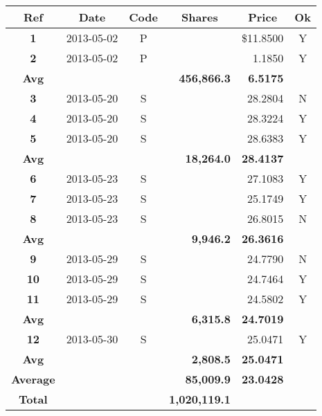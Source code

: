 \begin{longtable}{clcrrc}
\bfseries{Ref}&
\multicolumn{1}{c}{\bfseries{Date}}&
\bfseries{Code}&
\multicolumn{1}{c}{\bfseries{Shares}}&
\multicolumn{1}{c}{\bfseries{Price}}&
\bfseries{Ok}\\
\endhead
\bfseries{1}&
2013-05-02&
P&
\cellcolor{lightgray}{\textcolor{blue}{118,186.4}}&
\$11.8500&
Y\\
\bfseries{2}&
2013-05-02&
P&
\cellcolor{lightgray}{\textcolor{blue}{795,546.2}}&
1.1850&
Y\\
\bfseries{Avg}&
&
\multicolumn{1}{l}{}&
\bfseries{456,866.3}&
\bfseries{6.5175}&
\\
\bfseries{3}&
2013-05-20&
S&
\cellcolor{lightgray}{\textcolor{blue}{5,046.0}}&
28.2804&
N\\
\bfseries{4}&
2013-05-20&
S&
\cellcolor{lightgray}{\textcolor{blue}{35,742.5}}&
28.3224&
Y\\
\bfseries{5}&
2013-05-20&
S&
\cellcolor{lightgray}{\textcolor{blue}{14,003.5}}&
28.6383&
Y\\
\bfseries{Avg}&
&
\multicolumn{1}{l}{}&
\bfseries{18,264.0}&
\bfseries{28.4137}&
\\
\bfseries{6}&
2013-05-23&
S&
\cellcolor{lightgray}{\textcolor{blue}{3,364.0}}&
27.1083&
Y\\
\bfseries{7}&
2013-05-23&
S&
\cellcolor{lightgray}{\textcolor{blue}{16,780.5}}&
25.1749&
Y\\
\bfseries{8}&
2013-05-23&
S&
\cellcolor{lightgray}{\textcolor{blue}{9,694.2}}&
26.8015&
N\\
\bfseries{Avg}&
&
\multicolumn{1}{l}{}&
\bfseries{9,946.2}&
\bfseries{26.3616}&
\\
\bfseries{9}&
2013-05-29&
S&
\cellcolor{lightgray}{\textcolor{blue}{6,601.9}}&
24.7790&
N\\
\bfseries{10}&
2013-05-29&
S&
\cellcolor{lightgray}{\textcolor{blue}{5,659.5}}&
24.7464&
Y\\
\bfseries{11}&
2013-05-29&
S&
\cellcolor{lightgray}{\textcolor{blue}{6,686.0}}&
24.5802&
Y\\
\bfseries{Avg}&
&
\multicolumn{1}{l}{}&
\bfseries{6,315.8}&
\bfseries{24.7019}&
\\
\bfseries{12}&
2013-05-30&
S&
\cellcolor{lightgray}{\textcolor{blue}{2,808.5}}&
25.0471&
Y\\
\bfseries{Avg}&
&
\multicolumn{1}{l}{}&
\bfseries{2,808.5}&
\bfseries{25.0471}&
\\
\bfseries{Average}&
&
\multicolumn{1}{l}{}&
\bfseries{85,009.9}&
\bfseries{23.0428}&
\\
\bfseries{Total}&
&
\multicolumn{1}{l}{}&
\bfseries{1,020,119.1}&
\bfseries{}&
\\
\end{longtable}
